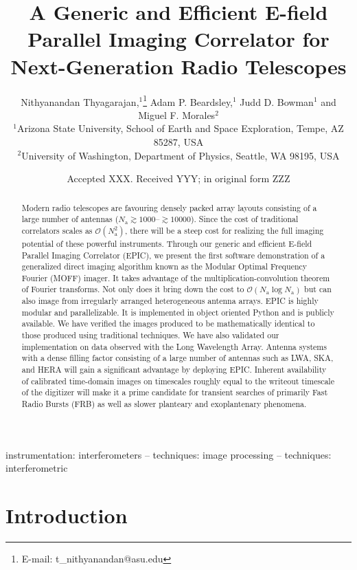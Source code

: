\documentclass[a4paper,fleqn,usenatbib]{../mnras}
\title[E-field Parallel Imaging Correlator]{A Generic and Efficient E-field Parallel Imaging Correlator for Next-Generation Radio Telescopes}
\author[Thyagarajan et al.]{
Nithyanandan Thyagarajan,$^{1}$\thanks{E-mail: t\_nithyanandan@asu.edu}
Adam P. Beardsley,$^{1}$
Judd D. Bowman$^{1}$
\newauthor
and Miguel F. Morales$^{2}$
\\
$^{1}$Arizona State University, School of Earth and Space Exploration, Tempe, AZ 85287, USA\\
$^{2}$University of Washington, Department of Physics, Seattle, WA 98195, USA\\
}
\date{Accepted XXX. Received YYY; in original form ZZZ}
\begin{document}
\label{firstpage}
\pagerange{\pageref{firstpage}--\pageref{lastpage}}
\maketitle

\begin{abstract}
Modern radio telescopes are favouring densely packed array layouts 
consisting of a large number of antennas 
($N_\textrm{a}\gtrsim 1000$--$\gtrsim 10000$). Since the cost of traditional 
correlators scales as $\mathcal{O}(N_\textrm{a}^2)$, there will be a steep cost for 
realizing the full imaging potential of these powerful instruments. Through 
our generic and efficient E-field Parallel Imaging Correlator (EPIC), we present 
the first software demonstration of a generalized direct imaging algorithm 
known as the Modular Optimal Frequency Fourier (MOFF) imager. It takes 
advantage of the multiplication-convolution theorem of Fourier transforms. Not 
only does it bring down the cost to $\mathcal{O}(N_\textrm{a}\log N_\textrm{a})$ 
but can also image from irregularly arranged heterogeneous antenna arrays. 
EPIC is highly modular and parallelizable. It is implemented in object oriented 
Python and is publicly available. We have verified the images produced to be 
mathematically identical to those produced using traditional techniques. We have 
also validated our implementation on data observed with the Long Wavelength 
Array. Antenna systems with a dense filling factor consisting of a large number 
of antennas such as LWA, SKA, and HERA will gain a significant advantage by 
deploying EPIC. Inherent availability of calibrated time-domain images on 
timescales roughly equal to the writeout timescale of the digitizer will make 
it a prime candidate for transient searches of primarily Fast Radio Bursts (FRB) 
as well as slower planteary and exoplantenary phenomena. 
\end{abstract}

\begin{keywords}
instrumentation: interferometers -- techniques: image processing -- techniques: interferometric
\end{keywords}



\section{Introduction}
\end{document}
